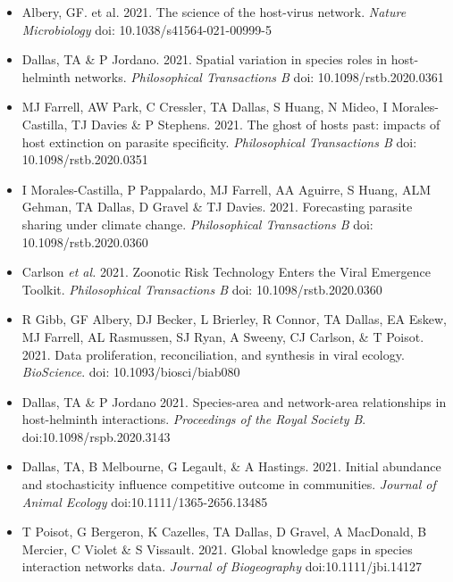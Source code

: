 \documentclass[]{CV}
\begin{document}
{}

\begin{itemize}

\item Albery, GF. et al. 2021. The science of the host-virus network. \textit{Nature Microbiology} doi: 10.1038/s41564-021-00999-5

\item {\mefont Dallas, TA} \& P Jordano. 2021. Spatial variation in species roles in host-helminth networks. \textit{Philosophical Transactions B} doi: 10.1098/rstb.2020.0361

\item MJ Farrell, AW Park, C Cressler, {\mefont TA Dallas}, S Huang, N Mideo, I Morales-Castilla, TJ Davies \& P Stephens. 2021. The ghost of hosts past: impacts of host extinction on parasite specificity. \textit{Philosophical Transactions B} doi: 10.1098/rstb.2020.0351

\item I Morales-Castilla, P Pappalardo, MJ Farrell, AA Aguirre, S Huang, ALM Gehman, {\mefont TA Dallas}, D Gravel \& TJ Davies. 2021. Forecasting parasite sharing under climate change. \textit{Philosophical Transactions B} doi: 10.1098/rstb.2020.0360

\item Carlson \textit{et al.} 2021. Zoonotic Risk Technology Enters the Viral Emergence Toolkit. \textit{Philosophical Transactions B} doi: 10.1098/rstb.2020.0360

\item R Gibb, GF Albery, DJ Becker, L Brierley, R Connor, {\mefont TA Dallas}, EA Eskew, MJ Farrell, AL Rasmussen, SJ Ryan, A Sweeny, CJ Carlson, \& T Poisot. 2021. Data proliferation, reconciliation, and synthesis in viral ecology. \textit{BioScience}. doi: 10.1093/biosci/biab080

\item {\mefont Dallas, TA} \& P Jordano 2021. Species-area and network-area relationships in host-helminth interactions. \textit{Proceedings of the Royal Society B}. doi:10.1098/rspb.2020.3143

\item {\mefont Dallas, TA}, B Melbourne, G Legault, \& A Hastings. 2021. Initial abundance and stochasticity influence competitive outcome in communities. \textit{Journal of Animal Ecology} doi:10.1111/1365-2656.13485

\item T Poisot, G Bergeron, K Cazelles, {\mefont TA Dallas}, D Gravel, A MacDonald, B Mercier, C Violet \& S Vissault. 2021. Global knowledge gaps in species interaction networks data. \textit{Journal of Biogeography} doi:10.1111/jbi.14127


\end{itemize}
\end{document}
